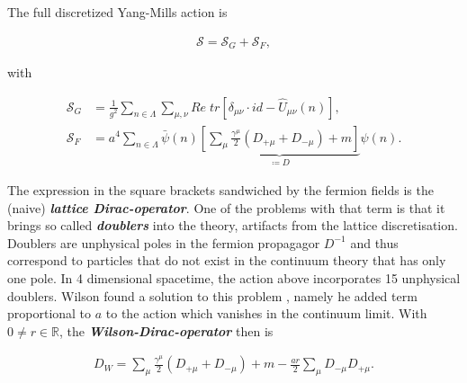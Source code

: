 \documentclass{article}
\theoremstyle{plain} %
\theoremstyle{convention} %
\theoremstyle{remark} %
\def\df#1{\textbf{\textit{#1}}}
\numberwithin{equation}{section}
\begin{document}
The full discretized Yang-Mills action is

\begin{align*}
    \mathcal{S} = \mathcal{S}_G + \mathcal{S}_F,
\end{align*}

with

\begin{align*}
    \mathcal{S}_G &= \frac{1}{g^2} \sum_{n \in \Lambda} \sum_{\mu, \nu} Re \; tr\left[ \delta_{\mu \nu} \cdot id - \hat{U}_{\mu \nu}(n) \right], \\
    \mathcal{S}_F &= a^4 \sum_{n \in \Lambda} \bar{\psi}(n) \underbrace{\left[ \sum_{\mu} \frac{\gamma^{\mu}}{2} (D_{+\mu} + D_{-\mu}) + m \right]}_{\coloneqq D} \psi(n).
\end{align*}

The expression in the square brackets sandwiched by the fermion fields is the (naive) \df{lattice Dirac-operator}. One of the problems with that term is that it brings so called \df{doublers} into the theory, artifacts from the lattice discretisation. Doublers are unphysical poles in the fermion propagagor $D^{-1}$ and thus correspond to particles that do not exist in the continuum theory that has only one pole. In 4 dimensional spacetime, the action above incorporates \num{15} unphysical doublers\footnotemark. Wilson found a solution to this problem \cite{wilson1974}, namely he added term proportional to $a$ to the action which vanishes in the continuum limit. With $0 \ne r \in \mathbb{R}$, the \df{Wilson-Dirac-operator} then is


\begin{align}
    D_W = \sum_{\mu} \frac{\gamma^{\mu}}{2} (D_{+\mu} + D_{-\mu}) + m - \frac{a r}{2} \sum_{\mu} D_{-\mu} D_{+\mu}. \label{eq:dwop}
\end{align}
\end{document}
